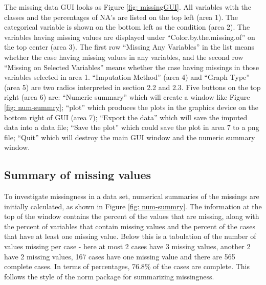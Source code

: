 \documentclass[english]{article}
\begin{document}
The missing data GUI looks as Figure \ref{fig: missingGUI}. All variables with the classes and the percentages of NA's are listed on the top left (area 1). The categorical variable is shown on the bottom left as the condition (area 2). The variables having missing values are displayed under ``Color.by.the.missing.of'' on the top center (area 3). The first row ``Missing Any Variables'' in the list means whether the case having missing values in any variables, and the second row ``Missing on Selected Variables'' means whether the case having missings in those variables selected in area 1. ``Imputation Method'' (area 4) and ``Graph Type'' (area 5) are two radios interpreted in section 2.2 and 2.3. Five buttons on the top right (area 6) are: ``Numeric summary'' which will create a window like Figure \ref{fig: num-summry}; ``plot'' which produces the plots in the graphics device on the bottom right of GUI (area 7); ``Export the data'' which will save the imputed data into a data file; ``Save the plot'' which could save the plot in area 7 to a png file; ``Quit'' which will destroy the main GUI window and the numeric summary window.

\subsection{Summary of missing values}

To investigate missingness in a data set, numerical summaries of the missings are initially calculated, as shown in Figure \ref{fig: num-summry}. The information at the top of the window contains the percent of the values that are missing, along with the percent of variables that contain missing values and the percent of the cases that have at least one missing value. Below this is a tabulation of the number of values missing per case - here at most 2 cases have 3 missing values, another 2 have 2 missing values, 167 cases have one missing value and there are 565 complete cases. In terms of percentages, 76.8\% of the cases are complete. This follows the style of the norm package for summarizing missingness.
\end{document}
